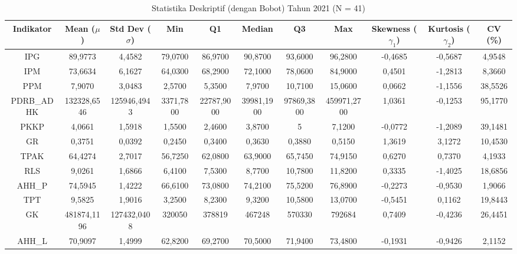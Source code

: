 \begin{table}[H]
\centering
\caption{Statistika Deskriptif (dengan Bobot) Tahun 2021 (N = 41)} \label{tab:app1desc_2021}
\begin{adjustbox}{max width=\textwidth, max height=0.85\textheight}
\begin{tabular}{|c|c|c|c|c|c|c|c|c|c|c|}
\hline
\textbf{Indikator} & \textbf{Mean ($\mu$)} & \textbf{Std Dev ($\sigma$)} & \textbf{Min} & \textbf{Q1} & \textbf{Median} & \textbf{Q3} & \textbf{Max} & \textbf{Skewness ($\gamma_1$)} & \textbf{Kurtosis ($\gamma_2$)} & \textbf{CV (\%)} \\
\hline
IPG & 89,9773 & 4,4582 & 79,0700 & 86,9700 & 90,8700 & 93,6000 & 96,2800 & -0,4685 & -0,5687 & 4,9548 \\
IPM & 73,6634 & 6,1627 & 64,0300 & 68,2900 & 72,1000 & 78,0600 & 84,9000 & 0,4501 & -1,2813 & 8,3660 \\
PPM & 7,9070 & 3,0483 & 2,5700 & 5,3500 & 7,9700 & 10,7100 & 15,0600 & 0,0662 & -1,1556 & 38,5526 \\
PDRB\_ADHK & 132328,6546 & 125946,4943 & 3371,7800 & 22787,9000 & 39981,1900 & 97869,3800 & 459971,2700 & 1,0361 & -0,1253 & 95,1770 \\
PKKP & 4,0661 & 1,5918 & 1,5500 & 2,4600 & 3,8700 & 5 & 7,1200 & -0,0772 & -1,2089 & 39,1481 \\
GR & 0,3751 & 0,0392 & 0,2450 & 0,3400 & 0,3630 & 0,3880 & 0,5150 & 1,3619 & 3,1272 & 10,4530 \\
TPAK & 64,4274 & 2,7017 & 56,7250 & 62,0800 & 63,9000 & 65,7450 & 74,9150 & 0,6270 & 0,7370 & 4,1933 \\
RLS & 9,0261 & 1,6866 & 6,4100 & 7,5300 & 8,7700 & 10,7800 & 11,8200 & 0,3335 & -1,4025 & 18,6856 \\
AHH\_P & 74,5945 & 1,4222 & 66,6100 & 73,0800 & 74,2100 & 75,5200 & 76,8900 & -0,2273 & -0,9530 & 1,9066 \\
TPT & 9,5825 & 1,9016 & 3,2500 & 8,2300 & 9,3200 & 10,5800 & 13,0700 & -0,5451 & 0,1162 & 19,8443 \\
GK & 481874,1196 & 127432,0408 & 320050 & 378819 & 467248 & 570330 & 792684 & 0,7409 & -0,4236 & 26,4451 \\
AHH\_L & 70,9097 & 1,4999 & 62,8200 & 69,2700 & 70,5000 & 71,9400 & 73,4800 & -0,1931 & -0,9426 & 2,1152 \\
\hline
\end{tabular}
\end{adjustbox}
\end{table}